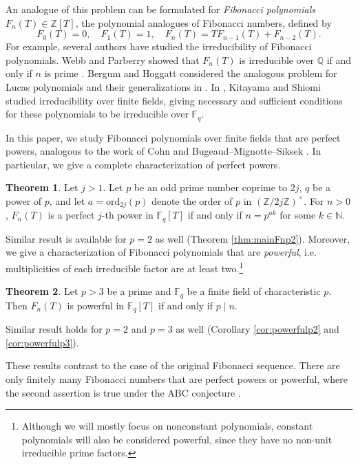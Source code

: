 \documentclass[letterpaper, 10pt]{article}
\newcommand{\bF}{\mathbb{F}}
\newcommand{\bQ}{\mathbb{Q}}
\newcommand{\bZ}{\mathbb{Z}}
\newcommand{\1}{\mathds{1}}	%
\theoremstyle{definition}
\newtheorem{theorem}{Theorem}[section]
\theoremstyle{remark}
\begin{document}
An analogue of this problem can be formulated for \emph{Fibonacci polynomials} $F_n(T) \in \bZ[T]$, the polynomial analogues of Fibonacci numbers, defined by
\begin{equation}
\label{eqn:fibo_poly}
    F_0(T) = 0, \quad F_1(T) = 1, \quad F_{n}(T) = T F_{n-1}(T) + F_{n-2}(T).
\end{equation}
For example, several authors have studied the irreducibility of Fibonacci polynomials. Webb and Parberry showed that $F_n(T)$ is irreducible over $\bQ$ if and only if $n$ is prime \cite{webb1969divisibility}.
Bergum and Hoggatt considered the analogous problem for Lucas polynomials and their generalizations in \cite{bergum1974irreducibility}.
In \cite{kitayama2017irreducibility}, Kitayama and Shiomi studied irreducibility over finite fields, giving necessary and sufficient conditions for these polynomials to be irreducible over $\bF_q$.

In this paper, we study Fibonacci polynomials over finite fields that are perfect powers, analogous to the work of Cohn \cite{cohn1964square} and Bugeaud--Mignotte--Siksek \cite{bugeaud2006classical}.
In particular, we give a complete characterization of perfect powers.
\begin{theorem}
\label{thm:mainFn}
    Let $j > 1$. Let $p$ be an odd prime number coprime to \(2j\), $q$ be a power of $p$, and let $a = \mathrm{ord}_{2j}(p)$ denote the order of $p$ in $\left( \mathbb{Z}/2j\mathbb{Z} \right)^\times$. For $n > 0$, $F_n(T)$ is a perfect $j$-th power in $\mathbb{F}_q[T]$ if and only if $n = p^{ak}$ for some $k \in \mathbb{N}$.
\end{theorem}
Similar result is available for \(p = 2\) as well (Theorem \ref{thm:mainFnp2}).
Moreover, we give a characterization of Fibonacci polynomials that are \emph{powerful}, i.e. multiplicities of each irreducible factor are at least two.\footnote{Although we will mostly focus on nonconstant polynomials, constant polynomials will also be considered powerful, since they have no non-unit irreducible prime factors.}
\begin{theorem}
    \label{thm:mainFnpowerful}
    Let $p > 3$ be a prime and $\bF_q$ be a finite field of characteristic $p$.
    Then \(F_n(T)\) is powerful in \(\bF_q[T]\) if and only if \(p \mid n\).
\end{theorem}
Similar result holds for $p = 2$ and $p = 3$ as well (Corollary \ref{cor:powerfulp2} and \ref{cor:powerfulp3}).

These results contrast to the case of the original Fibonacci sequence.
There are only finitely many Fibonacci numbers that are perfect powers or powerful, where the second assertion is true under the ABC conjecture \cite{ribenboim1999abc,yabuta2007abc}.
\end{document}
